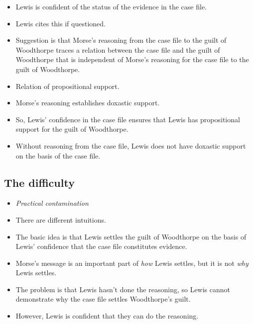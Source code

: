 \documentclass[10pt]{article}
\begin{document}
\begin{itemize}
\item Lewis is confident of the status of the evidence in the case file.
\item Lewis cites this if questioned.
\item Suggestion is that Morse's reasoning from the case file to the guilt of Woodthorpe traces a relation between the case file and the guilt of Woodthorpe that is independent of Morse's reasoning for the case file to the guilt of Woodthorpe.
\item Relation of propositional support.
\item Morse's reasoning establishes doxastic support.
\item So, Lewis' confidence in the case file ensures that Lewis has propositional support for the guilt of Woodthorpe.
\item Without reasoning from the case file, Lewis does not have doxastic support on the basis of the case file.
\end{itemize}

\newpage

\subsection{The difficulty}
\label{sec:difficulty}

\begin{itemize}
\item \emph{Practical contamination}
\item There are different intuitions.
\end{itemize}




\begin{itemize}
\item The basic idea is that Lewis settles the guilt of Woodthorpe on the basis of Lewis' confidence that the case file constitutes evidence.
\item Morse's message is an important part of \emph{how} Lewis settles, but it is not \emph{why} Lewis settles.
\end{itemize}

\begin{itemize}
\item The problem is that Lewis hasn't done the reasoning, so Lewis cannot demonstrate why the case file settles Woodthorpe's guilt.
\item However, Lewis is confident that they can do the reasoning.
\end{itemize}
\end{document}
